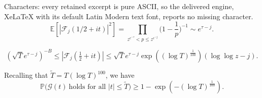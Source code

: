 \documentclass[10pt,a4paper]{amsart}
\def\E{\mathbb E}
\def\P{\mathbb P}
\def\TT{\widetilde{T}}
\begin{document}
Characters: every retained excerpt is pure ASCII, so the delivered engine, XeLaTeX with its default Latin Modern text font, reports no missing character.
 \begin{equation} 
 \label{3.4} 
 \E[ |{\mathcal F}_j(1/2+it)|^2 ] = \prod_{z^{e^{-\tau}} < p \le z^{e^{-j}}} \Big( 1- \frac{1}{p}\Big)^{-1} \sim e^{\tau-j}.
 \end{equation} 

\begin{equation}\label{eqn: g(t)}
     (\sqrt{T} e^{\tau-j})^{-B}  \le |{\mathcal F}_j(\tfrac 1 2 +it)|  \le \sqrt{T} e^{\tau-j}\exp((\log T)^{\frac 1{100}}) (\log \log z - j).   
\end{equation}

\begin{proposition} \label{prop3.3}  Recalling that $\TT = T(\log T)^{100}$, we have  
\begin{equation}\label{eqn: exceptprob}
\P\Big( \mathcal{G}(t)~\text{holds for all $|t|\le \TT$} \Big)  \ge 1 -\exp (-(\log T)^{\frac 1{100}}). 
\end{equation}
\end{proposition} 
\end{document}
